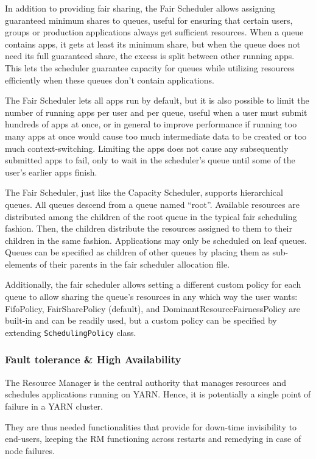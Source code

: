 In addition to providing fair sharing, the Fair Scheduler allows assigning guaranteed minimum shares to queues, useful for ensuring that certain users, groups or production applications always get sufficient resources. When a queue contains apps, it gets at least its minimum share, but when the queue does not need its full guaranteed share, the excess is split between other running apps. This lets the scheduler guarantee capacity for queues while utilizing resources efficiently when these queues don’t contain applications.

The Fair Scheduler lets all apps run by default, but it is also possible to limit the number of running apps per user and per queue, useful when a user must submit hundreds of apps at once, or in general to improve performance if running too many apps at once would cause too much intermediate data to be created or too much context-switching. Limiting the apps does not cause any subsequently submitted apps to fail, only to wait in the scheduler’s queue until some of the user’s earlier apps finish.

The Fair Scheduler, just like the Capacity Scheduler, supports hierarchical queues. All queues descend from a queue named “root”. Available resources are distributed among the children of the root queue in the typical fair scheduling fashion. Then, the children distribute the resources assigned to them to their children in the same fashion. Applications may only be scheduled on leaf queues. Queues can be specified as children of other queues by placing them as sub-elements of their parents in the fair scheduler allocation file.

Additionally, the fair scheduler allows setting a different custom policy for each queue to allow sharing the queue’s resources in any which way the user wants: FifoPolicy, FairSharePolicy (default), and DominantResourceFairnessPolicy are built-in and can be readily used, but a custom policy can be specified by extending \texttt{SchedulingPolicy} class. 

\subsubsection{Fault tolerance \& High Availability}

The Resource Manager is the central authority that manages resources and schedules applications running on YARN. Hence, it is potentially a single point of failure in a YARN cluster. 

They are thus needed functionalities that provide for down-time invisibility to end-users, keeping the RM functioning across restarts and remedying in case of node failures.

